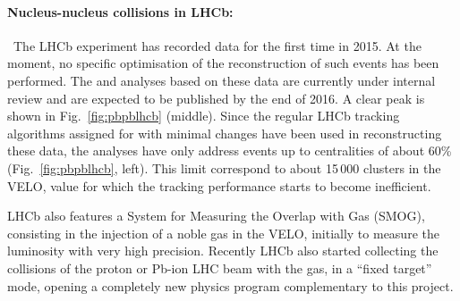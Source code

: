 \documentclass[a4paper,11pt]{article}
\begin{document}
\paragraph{Nucleus-nucleus collisions in LHCb:\ }\ 
The LHCb experiment has recorded \pbpb data for the first time in 2015. At the moment, no specific optimisation of the reconstruction of such events has been performed. 
The \Dz and \Jpsi analyses based on these data are currently under internal review and are expected to be published by the end of 2016. A clear \Dz peak is shown in Fig.~\ref{fig:pbpblhcb} (middle). Since the regular LHCb tracking algorithms assigned for \pp with minimal changes have been used in reconstructing these data, the analyses have only address events up to centralities of about 60\% (Fig.~\ref{fig:pbpblhcb}, left). This limit correspond to about 15\,000 clusters in the VELO, value for which the tracking performance starts to become inefficient.


LHCb also features a System for Measuring the Overlap with Gas (SMOG), consisting in the injection of a noble gas in the VELO, initially to measure the luminosity with very high precision. Recently LHCb also started collecting the collisions of the proton or Pb-ion LHC beam with the gas, in a ``fixed target'' mode, opening a completely new physics program complementary to this project.
\end{document}
